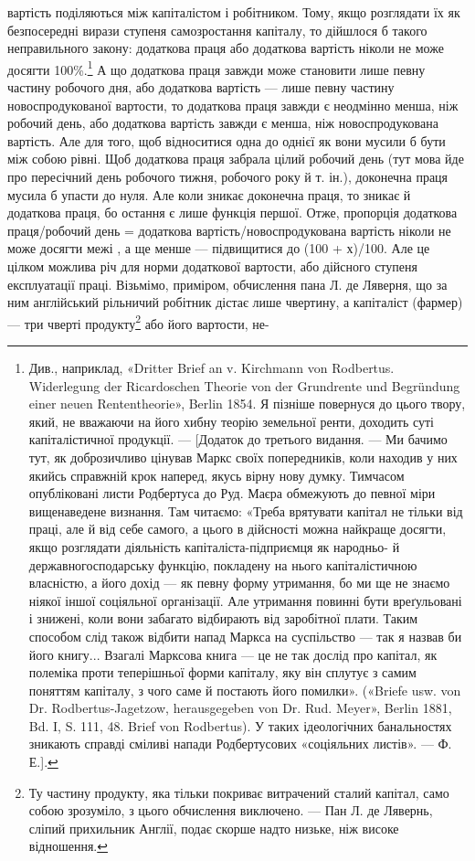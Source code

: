 \parcont{}  %
вартість поділяються між капіталістом і робітником. Тому, якщо
розглядати їх як безпосередні вирази ступеня самозростання
капіталу, то дійшлося б такого неправильного закону: додаткова
праця або додаткова вартість ніколи не може досягти 100\%.\footnote{
Див., наприклад, «Dritter Brief an v. Kirchmann von Rodbertus.
Widerlegung der Ricardoschen Theorie von der Grundrente und Begründung
einer neuen Rententheorie», Berlin 1854. Я пізніше повернуся
до цього твору, який, не вважаючи на його хибну теорію земельної ренти,
доходить суті капіталістичної продукції. — [Додаток до третього видання.
— Ми бачимо тут, як доброзичливо цінував Маркс своїх попередників,
коли находив у них якийсь справжній крок наперед, якусь вірну
нову думку. Тимчасом опубліковані листи Родбертуса до Руд. Маєра
обмежують до певної міри вищенаведене визнання. Там читаємо: «Треба
врятувати капітал не тільки від праці, але й від себе самого, а цього в
дійсності можна найкраще досягти, якщо розглядати діяльність капіталіста-підприємця як народньо- й
державногосподарську функцію,
покладену на нього капіталістичною власністю, а його дохід — як певну
форму утримання, бо ми ще не знаємо ніякої іншої соціяльної організації.
Але утримання повинні бути вреґульовані і знижені, коли вони
забагато відбирають від заробітної плати. Таким способом слід також
відбити напад Маркса на суспільство — так я назвав би його книгу...
Взагалі Марксова книга — це не так дослід про капітал, як полеміка
проти теперішньої форми капіталу, яку він сплутує з самим поняттям
капіталу, з чого саме й постають його помилки». («Briefe usw. von Dr.
Rodbertus-Jagetzow, herausgegeben von Dr. Rud. Meyer», Berlin 1881,
Bd. I, S. 111, 48. Brief von Rodbertus). У таких ідеологічних банальностях
зникають справді сміливі напади Родбертусових «соціяльних листів».
— Ф. Е.].
}
А що додаткова праця завжди може становити лише певну частину
робочого дня, або додаткова вартість — лише певну частину
новоспродукованої вартости, то додаткова праця завжди є неодмінно
менша, ніж робочий день, або додаткова вартість завжди
є менша, ніж новоспродукована вартість. Але для того, щоб
відноситися одна до однієї як  вони мусили б бути між собою
рівні. Щоб додаткова праця забрала цілий робочий день (тут
мова йде про пересічний день робочого тижня, робочого року
й т. ін.), доконечна праця мусила б упасти до нуля. Але коли
зникає доконечна праця, то зникає й додаткова праця, бо остання
є лише функція першої. Отже, пропорція додаткова праця/робочий день =
додаткова вартість/новоспродукована вартість ніколи не може досягти межі
, а ще менше — підвищитися до (100 + х)/100. Але це цілком можлива річ
для норми додаткової вартости, або дійсного ступеня експлуатації
праці. Візьмімо, приміром, обчислення пана Л. де Ляверня,
що за ним англійський рільничий робітник дістає лише чвертину,
а капіталіст (фармер) — три чверті продукту\footnote{
Ту частину продукту, яка тільки покриває витрачений сталий
капітал, само собою зрозуміло, з цього обчислення виключено. — Пан
Л. де Лявернь, сліпий прихильник Англії, подає скорше надто низьке,
ніж високе відношення.
} або його вартости, не-
\parbreak{}  %
